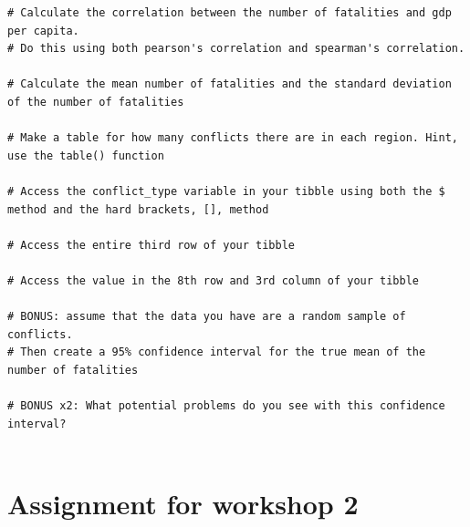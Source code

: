 \documentclass[
]{book}
\begin{document}
\begin{verbatim}
# Calculate the correlation between the number of fatalities and gdp per capita. 
# Do this using both pearson's correlation and spearman's correlation.

# Calculate the mean number of fatalities and the standard deviation of the number of fatalities

# Make a table for how many conflicts there are in each region. Hint, use the table() function

# Access the conflict_type variable in your tibble using both the $ method and the hard brackets, [], method

# Access the entire third row of your tibble

# Access the value in the 8th row and 3rd column of your tibble

# BONUS: assume that the data you have are a random sample of conflicts. 
# Then create a 95% confidence interval for the true mean of the number of fatalities

# BONUS x2: What potential problems do you see with this confidence interval?


\end{verbatim}

\hypertarget{assignment-for-workshop-2}{%
\chapter*{Assignment for workshop 2}\label{assignment-for-workshop-2}}
\end{document}

